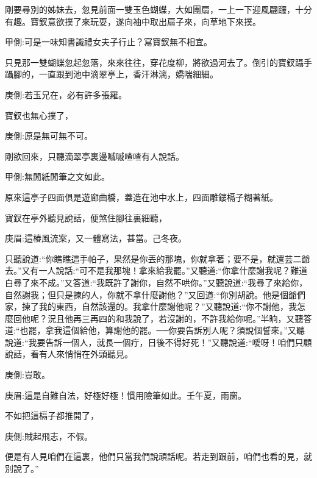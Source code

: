 \begin{parag}
    剛要尋別的姊妹去，忽見前面一雙玉色蝴蝶，大如團扇，一上一下迎風翩躚，十分有趣。寶釵意欲撲了來玩耍，遂向袖中取出扇子來，向草地下來撲。\begin{note}甲側:可是一味知書識禮女夫子行止？寫寶釵無不相宜。\end{note}只見那一雙蝴蝶忽起忽落，來來往往，穿花度柳，將欲過河去了。倒引的寶釵躡手躡腳的，一直跟到池中滴翠亭上，香汗淋漓，嬌喘細細。\begin{note}庚側:若玉兄在，必有許多張羅。\end{note}寶釵也無心撲了，\begin{note}庚側:原是無可無不可。\end{note}剛欲回來，只聽滴翠亭裏邊嘁嘁喳喳有人說話。\begin{note}甲側:無閒紙閒筆之文如此。\end{note}原來這亭子四面俱是遊廊曲橋，蓋造在池中水上，四面雕鏤槅子糊著紙。
\end{parag}


\begin{parag}
    寶釵在亭外聽見說話，便煞住腳往裏細聽，\begin{note}庚眉:這樁風流案，又一體寫法，甚當。己冬夜。\end{note}只聽說道:“你瞧瞧這手帕子，果然是你丟的那塊，你就拿著；要不是，就還芸二爺去。”又有一人說話:“可不是我那塊！拿來給我罷。”又聽道:“你拿什麼謝我呢？難道白尋了來不成。”又答道:“我既許了謝你，自然不哄你。”又聽說道:“我尋了來給你，自然謝我；但只是揀的人，你就不拿什麼謝他？”又回道:“你別胡說。他是個爺們家，揀了我的東西，自然該還的。我拿什麼謝他呢？”又聽說道:“你不謝他，我怎麼回他呢？況且他再三再四的和我說了，若沒謝的，不許我給你呢。”半晌，又聽答道:“也罷，拿我這個給他，算謝他的罷。──你要告訴別人呢？須說個誓來。”又聽說道:“我要告訴一個人，就長一個疔，日後不得好死！”又聽說道:“噯呀！咱們只顧說話，看有人來悄悄在外頭聽見。\begin{note}庚側:豈敢。\end{note}\begin{note}庚眉:這是自難自法，好極好極！慣用險筆如此。壬午夏，雨窗。\end{note}不如把這槅子都推開了，\begin{note}庚側:賊起飛志，不假。\end{note}便是有人見咱們在這裏，他們只當我們說頑話呢。若走到跟前，咱們也看的見，就別說了。”
\end{parag}


